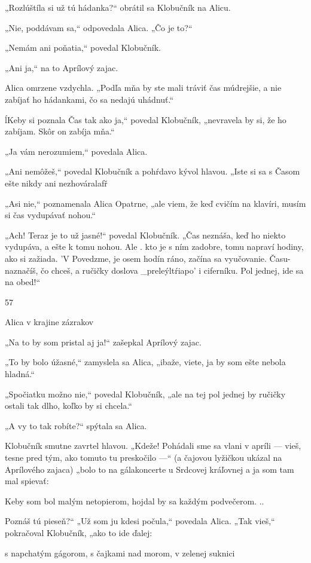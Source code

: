 \documentclass[12pt]{article}
\begin{document}
\begin{Parallel}[p]{}{}
{{„Rozlúštíla si už tú hádanka?“ obrátil sa Klobučník na
Alicu.

„Nie, poddávam sa,“ odpovedala Alica. „Čo je to?“

„Nemám ani poňatia,“ povedal Klobučník.

„Ani ja,“ na to Aprílový zajac.

Alica omrzene vzdychla. „Podľa mňa by ste mali tráviť
čas múdrejšie, a nie zabíjať ho hádankami, čo sa nedajú
uhádnuť.“

ĺKeby si poznala Čas tak ako ja,“ povedal Klobučník,
„nevravela by si, že ho zabíjam. Skôr on zabíja mňa.“

„Ja vám nerozumiem,“ povedala Alica.

„Ani nemôžeš,“ povedal Klobučník a pohŕdavo kývol
hlavou. „Iste si sa s Časom ešte nikdy ani nezhováralafř

„Asi nie,“ poznamenala Alica Opatrne, „ale viem, že keď
cvičím na klavíri, musím si čas vydupávať nohou.“

„Ach! Teraz je to už jasné!“ povedal Klobučník. „Čas
neznáša, keď ho niekto vydupáva, a ešte k tomu nohou. Ale
. kto je s ním zadobre, tomu napraví hodiny, ako si zažiada.
'V Povedzme, je osem hodín ráno, začína sa vyučovanie. \Len
Času- naznačíš, čo chceš, a ručičky doslova _preleýltŕiapo'
i ciferníku. Pol jednej, ide sa na obed!“

57

 

Alica v krajine zázrakov

„Na to by som pristal aj ja!“ zašepkal Aprílový zajac.

„To by bolo úžasné,“ zamyslela sa Alica, „ibaže, viete, ja
by som ešte nebola hladná.“

„Spočiatku možno nie,“ povedal Klobučník, „ale na tej
pol jednej by ručičky ostali tak dlho, koľko by si chcela.“

„A vy to tak robíte?“ spýtala sa Alica.

Klobučník smutne zavrtel hlavou. „Kdeže! Pohádali sme
sa vlani v apríli — vieš, tesne pred tým, ako tomuto tu
preskočilo —“ (a čajovou lyžičkou ukázal na Aprílového
zajaca) „bolo to na gálakoncerte u Srdcovej kráľovnej a ja
som tam mal spievať:

Keby som bol malým netopierom,
hojdal by sa každým podvečerom. ..

Poznáš tú pieseň?“
„Už som ju kdesi počula,“ povedala Alica.
„Tak vieš,“ pokračoval Klobučník, „ako to ide ďalej:

s napchatým gágorom,
s čajkami nad morom,
v zelenej suknici

}}
\end{Parallel}
\end{document}
